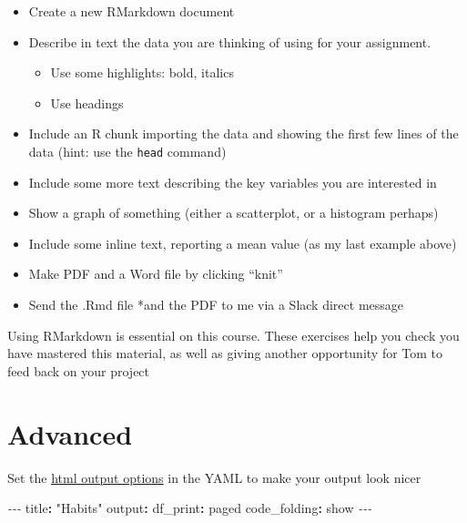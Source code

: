 \documentclass[
]{book}
\newenvironment{Shaded}{\begin{snugshade}}{\end{snugshade}}
\newcommand{\AttributeTok}[1]{\textcolor[rgb]{0.77,0.63,0.00}{#1}}
\newcommand{\FunctionTok}[1]{\textcolor[rgb]{0.00,0.00,0.00}{#1}}
\newcommand{\KeywordTok}[1]{\textcolor[rgb]{0.13,0.29,0.53}{\textbf{#1}}}
\newcommand{\PreprocessorTok}[1]{\textcolor[rgb]{0.56,0.35,0.01}{\textit{#1}}}
\newcommand{\StringTok}[1]{\textcolor[rgb]{0.31,0.60,0.02}{#1}}
\providecommand{\tightlist}{%
  \setlength{\itemsep}{0pt}\setlength{\parskip}{0pt}}
\begin{document}
\begin{itemize}
\tightlist
\item
  Create a new RMarkdown document
\item
  Describe in text the data you are thinking of using for your assignment.

  \begin{itemize}
  \tightlist
  \item
    Use some highlights: bold, italics
  \item
    Use headings
  \end{itemize}
\item
  Include an R chunk importing the data and showing the first few lines of the data (hint: use the \texttt{head} command)
\item
  Include some more text describing the key variables you are interested in
\item
  Show a graph of something (either a scatterplot, or a histogram perhaps)
\item
  Include some inline text, reporting a mean value (as my last example above)
\item
  Make PDF and a Word file by clicking ``knit''
\item
  Send the .Rmd file *and the PDF to me via a Slack direct message
\end{itemize}

Using RMarkdown is essential on this course. These exercises help you check you have mastered this material, as well as giving another opportunity for Tom to feed back on your project

\hypertarget{advanced}{%
\section{Advanced}\label{advanced}}

Set the \href{https://bookdown.org/yihui/rmarkdown/html-document.html}{html output options} in the YAML to make your output look nicer

\begin{Shaded}
\begin{Highlighting}[]
\PreprocessorTok{{-}{-}{-}}
\FunctionTok{title}\KeywordTok{:}\AttributeTok{ }\StringTok{"Habits"}
\FunctionTok{output}\KeywordTok{:}
\AttributeTok{  }\FunctionTok{df\_print}\KeywordTok{:}\AttributeTok{ }\StringTok{\textquotesingle{}paged\textquotesingle{}}
\AttributeTok{  }\FunctionTok{code\_folding}\KeywordTok{:}\AttributeTok{ }\StringTok{\textquotesingle{}show\textquotesingle{}}
\PreprocessorTok{{-}{-}{-}}
\end{Highlighting}
\end{Shaded}
\end{document}
